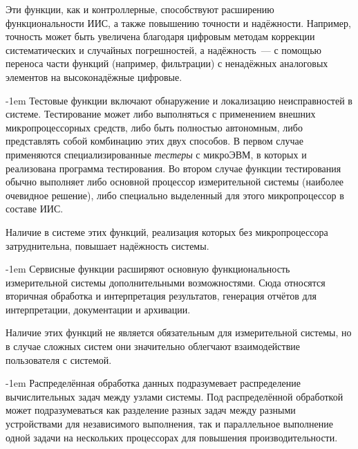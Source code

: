 \documentclass[a4paper, 14pt, titlepage]{extarticle}
\makeatletter
\newcommand{\term}[1]{\emph{#1}}
\renewcommand{\paragraph}{%
    \@startsection{paragraph}{4}%
    {\parindent}{\z@}{-1em}%
    {\normalfont\normalsize\bfseries}%
  }
\makeatother
\begin{document}
  Эти функции, как и контроллерные, способствуют расширению функциональности ИИС, а также повышению
  точности и надёжности. Например, точность может быть увеличена благодаря цифровым методам
  коррекции систематических и случайных погрешностей, а надёжность~--- с помощью переноса части
  функций (например, фильтрации) с ненадёжных аналоговых элементов на высоконадёжные цифровые.

  \paragraph{Тестовые функции} включают обнаружение и локализацию неисправностей в системе.
  Тестирование может либо выполняться с применением внешних микропроцессорных средств, либо быть
  полностью автономным, либо представлять собой комбинацию этих двух способов. В первом случае
  применяются специализированные \term{тестеры} с микроЭВМ, в которых и реализована программа
  тестирования. Во втором случае функции тестирования обычно выполняет либо основной процессор
  измерительной системы (наиболее очевидное решение), либо специально выделенный для этого
  микропроцессор в составе ИИС.

  Наличие в системе этих функций, реализация которых без микропроцессора затруднительна,
  повышает надёжность системы.

  \paragraph{Сервисные функции} расширяют основную функциональность измерительной системы
  дополнительными возможностями. Сюда относятся вторичная обработка и интерпретация результатов,
  генерация отчётов для интерпретации, документации и архивации.

  Наличие этих функций не является обязательным для измерительной системы, но в случае сложных
  систем они значительно облегчают взаимодействие пользователя с системой.

  \paragraph{Распределённая обработка данных} подразумевает распределение вычислительных задач между
  узлами системы. Под распределённой обработкой может подразумеваться как разделение разных задач
  между разными устройствами для независимого выполнения, так и параллельное выполнение одной задачи
  на нескольких процессорах для повышения производительности.
\end{document}
